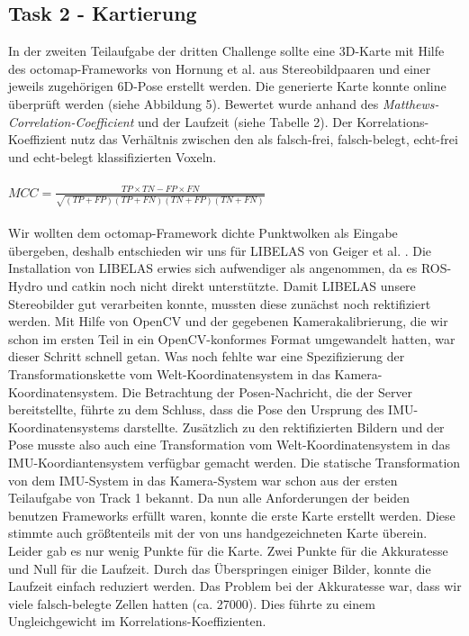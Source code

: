 \documentclass[12pt,titlepage, a4paper]{article}
\begin{document}
\FloatBarrier
			
\subsection{Task 2 - Kartierung}
In der zweiten Teilaufgabe der dritten Challenge sollte eine 3D-Karte mit Hilfe des octomap-Frameworks von Hornung et al. \cite{hornung13auro} aus Stereobildpaaren und einer jeweils zugehörigen 6D-Pose erstellt werden. Die generierte Karte konnte online überprüft werden (siehe Abbildung 5). Bewertet wurde anhand des \textit{Matthews-Correlation-Coefficient} und der Laufzeit (siehe Tabelle 2). Der Korrelations-Koeffizient nutz das Verhältnis zwischen den als falsch-frei, falsch-belegt, echt-frei und echt-belegt klassifizierten Voxeln.\\\\
$MCC = \frac{TP \times TN - FP \times FN}{\sqrt{(TP+FP)(TP+FN)(TN+FP)(TN+FN)}}$\\\\
Wir wollten dem octomap-Framework dichte Punktwolken als Eingabe übergeben, deshalb entschieden wir uns für LIBELAS von Geiger et al. \cite{Geiger2010ACCV}. Die Installation von LIBELAS erwies sich aufwendiger als angenommen, da es ROS-Hydro und catkin noch nicht direkt unterstützte. Damit LIBELAS unsere Stereobilder gut verarbeiten konnte, mussten diese zunächst noch rektifiziert werden. Mit Hilfe von OpenCV und der gegebenen Kamerakalibrierung, die wir schon im ersten Teil in ein OpenCV-konformes Format umgewandelt hatten, war dieser Schritt schnell getan. Was noch fehlte war eine Spezifizierung der Transformationskette vom Welt-Koordinatensystem in das Kamera-Koordinatensystem. Die Betrachtung der Posen-Nachricht, die der Server bereitstellte, führte zu dem Schluss, dass die Pose den Ursprung des IMU-Koordinatensystems darstellte. Zusätzlich zu den rektifizierten Bildern und der Pose musste also auch eine Transformation vom Welt-Koordinatensystem in das IMU-Koordiantensystem verfügbar gemacht werden. Die statische Transformation von dem IMU-System in das Kamera-System war schon aus der ersten Teilaufgabe von Track 1 bekannt. Da nun alle Anforderungen der beiden benutzen Frameworks erfüllt waren, konnte die erste Karte erstellt werden. Diese stimmte auch größtenteils mit der von uns handgezeichneten Karte überein. Leider gab es nur wenig Punkte für die Karte. Zwei Punkte für die Akkuratesse und Null für die Laufzeit. Durch das Überspringen einiger Bilder, konnte die Laufzeit einfach reduziert werden. Das Problem bei der Akkuratesse war, dass wir viele falsch-belegte Zellen hatten (ca. 27000). Dies führte zu einem Ungleichgewicht im Korrelations-Koeffizienten. 
\end{document}
